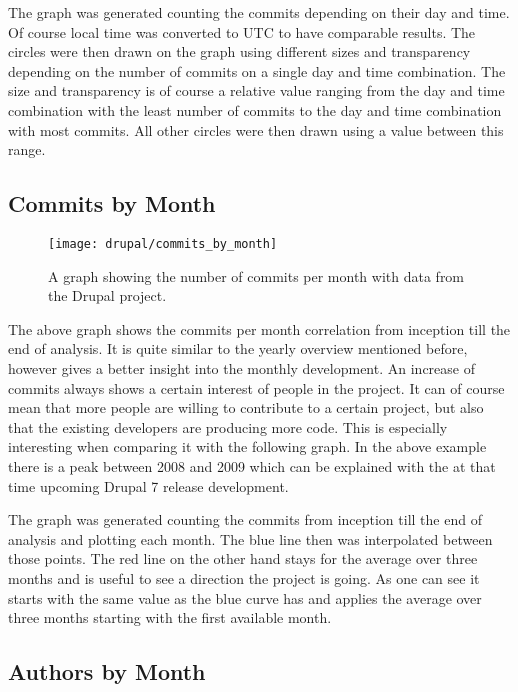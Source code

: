 The graph was generated counting the commits depending on their day and time.
Of course local time was converted to \ac{UTC} to have comparable results. The
circles were then drawn on the graph using different sizes and transparency
depending on the number of commits on a single day and time combination. The
size and transparency is of course a relative value ranging from the day and
time combination with the least number of commits to the day and time
combination with most commits. All other circles were then drawn using a value
between this range.


\subsection{Commits by Month} %

\begin{figure}[h!]
  \centering
  \texttt{[image: drupal/commits\_by\_month]}
  \caption{A graph showing the number of commits per month with data from the
  Drupal project.}
\end{figure}

The above graph shows the commits per month correlation from inception till the
end of analysis. It is quite similar to the yearly overview mentioned before,
however gives a better insight into the monthly development. An increase of
commits always shows a certain interest of people in the project. It can of
course mean that more people are willing to contribute to a certain project,
but also that the existing developers are producing more code. This is
especially interesting when comparing it with the following graph. In the above
example there is a peak between 2008 and 2009 which can be explained with the
at that time upcoming Drupal 7 release development.

The graph was generated counting the commits from inception till the end of
analysis and plotting each month. The blue line then was interpolated between
those points. The red line on the other hand stays for the average over three
months and is useful to see a direction the project is going. As one can see it
starts with the same value as the blue curve has and applies the average over
three months starting with the first available month.


\subsection{Authors by Month} %

